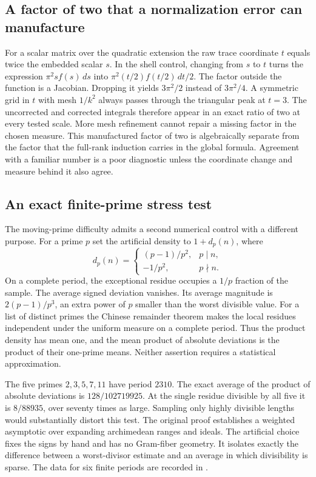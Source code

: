 \documentclass[12pt,letterpaper]{article}
\newcommand{\code}[1]{\texttt{\detokenize{#1}}}
\begin{document}
\subsection{A factor of two that a normalization error can manufacture}
For a scalar matrix over the quadratic extension the raw trace coordinate $t$ equals twice the embedded scalar $s$. In the shell control, changing from $s$ to $t$ turns the expression $\pi^2 s f(s)\,ds$ into $\pi^2(t/2)f(t/2)\,dt/2$. The factor outside the function is a Jacobian. Dropping it yields $3\pi^2/2$ instead of $3\pi^2/4$. A symmetric grid in $t$ with mesh $1/k^2$ always passes through the triangular peak at $t=3$. The uncorrected and corrected integrals therefore appear in an exact ratio of two at every tested scale. More mesh refinement cannot repair a missing factor in the chosen measure. This manufactured factor of two is algebraically separate from the factor that the full-rank induction carries in the global formula. Agreement with a familiar number is a poor diagnostic unless the coordinate change and measure behind it also agree.

\subsection{An exact finite-prime stress test}
The moving-prime difficulty admits a second numerical control with a different purpose. For a prime $p$ set the artificial density to $1+d_p(n)$, where
\[
 d_p(n)=\begin{cases}(p-1)/p^2,&p\mid n,\\-1/p^2,&p\nmid n.\end{cases}
\]
On a complete period, the exceptional residue occupies a $1/p$ fraction of the sample. The average signed deviation vanishes. Its average magnitude is $2(p-1)/p^3$, an extra power of $p$ smaller than the worst divisible value. For a list of distinct primes the Chinese remainder theorem makes the local residues independent under the uniform measure on a complete period. Thus the product density has mean one, and the mean product of absolute deviations is the product of their one-prime means. Neither assertion requires a statistical approximation.

The five primes $2,3,5,7,11$ have period $2310$. The exact average of the product of absolute deviations is $128/102719925$. At the single residue divisible by all five it is $8/88935$, over seventy times as large. Sampling only highly divisible lengths would substantially distort this test. The original proof establishes a weighted asymptotic over expanding archimedean ranges and ideals. The artificial choice fixes the signs by hand and has no Gram-fiber geometry. It isolates exactly the difference between a worst-divisor estimate and an average in which divisibility is sparse. The data for six finite periods are recorded in \code{binary/density_results.json}.
\end{document}
